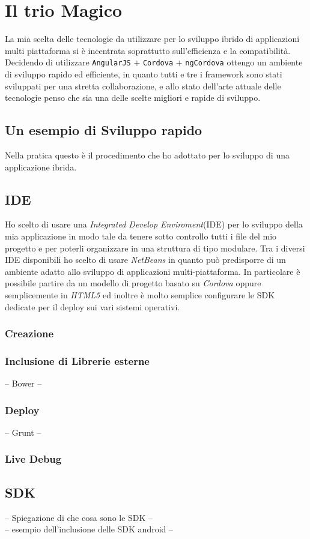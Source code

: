 \section{Il trio Magico}
La mia scelta delle tecnologie da utilizzare per lo sviluppo ibrido di applicazioni multi piattaforma si è incentrata soprattutto sull'efficienza e la compatibilità. Decidendo di utilizzare \texttt{AngularJS} + \texttt{Cordova} + \texttt{ngCordova} ottengo un ambiente di sviluppo rapido ed efficiente, in quanto tutti e tre i framework sono stati sviluppati per una stretta collaborazione, e allo stato dell'arte attuale delle tecnologie penso che sia una delle scelte migliori e rapide di sviluppo.
\subsection{Un esempio di Sviluppo rapido}
Nella pratica questo è il procedimento che ho adottato per lo sviluppo di una applicazione ibrida.
\subsection{IDE}
Ho scelto di usare una \emph{Integrated Develop Enviroment}(IDE) per lo sviluppo della mia applicazione in modo tale da tenere sotto controllo tutti i file del mio progetto e per poterli organizzare in una struttura di tipo modulare. 
Tra i diversi IDE disponibili ho scelto di usare \emph{NetBeans} in quanto può predisporre di un ambiente adatto allo sviluppo di applicazioni multi-piattaforma. In particolare è possibile partire da un modello di progetto basato su \emph{Cordova} oppure semplicemente in \emph{HTML5} ed inoltre è molto semplice configurare le SDK dedicate per il deploy sui vari sistemi operativi.
\subsubsection{Creazione}
\subsubsection{Inclusione di Librerie esterne}
-- Bower --
\subsubsection{Deploy}
-- Grunt --
\subsubsection{Live Debug}
\subsection{SDK}
-- Spiegazione di che cosa sono le SDK --\\
-- esempio dell'inclusione delle SDK android --\\
